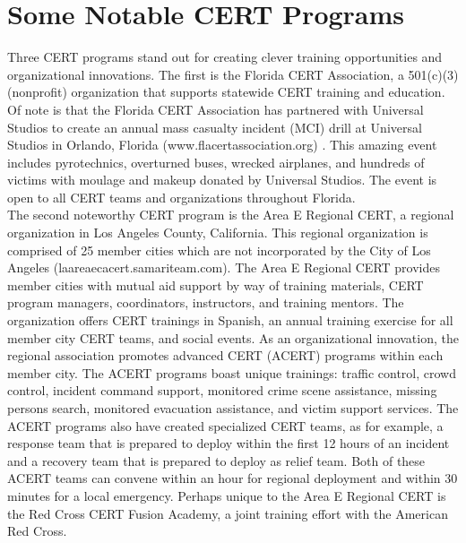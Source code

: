 \documentclass[11pt,fleqn]{book} %
\begin{document}
\vspace{2em}
\section{Some Notable CERT Programs}
Three CERT programs stand out for creating clever training opportunities and organizational innovations. The first is the Florida CERT Association, a 501(c)(3) (nonprofit) organization that supports statewide CERT training and education. Of note is that the Florida CERT Association has partnered with Universal Studios to create an annual mass casualty incident (MCI) drill at Universal Studios in Orlando, Florida (www.flacertassociation.org) . This amazing event includes pyrotechnics, overturned buses, wrecked airplanes, and hundreds of victims with moulage and makeup donated by Universal Studios. The event is open to all CERT teams and organizations throughout Florida.\\

\noindent The second noteworthy CERT program is the Area E Regional CERT, a regional organization in Los Angeles County, California. This regional organization is comprised of 25 member cities which are not incorporated by the City of Los Angeles (laareaecacert.samariteam.com). The Area E Regional CERT provides member cities with mutual aid support by way of training materials, CERT program managers, coordinators, instructors, and training mentors. The organization offers CERT trainings in Spanish, an annual training exercise for all member city CERT teams, and social events.  As an organizational innovation, the regional association promotes advanced CERT (ACERT) programs within each member city. The ACERT programs boast unique trainings: traffic control, crowd control, incident command support, monitored crime scene assistance, missing persons search, monitored evacuation assistance, and victim support services. The ACERT programs also have created specialized CERT teams, as for example, a response team that is prepared to deploy within the first 12 hours of an incident and a recovery team that is prepared to deploy as relief team. Both of these ACERT teams can convene within an hour for regional deployment and within 30 minutes for a local emergency. Perhaps unique to the Area E Regional CERT is the Red Cross CERT Fusion Academy, a joint training effort with the American Red Cross. \\
\end{document}
